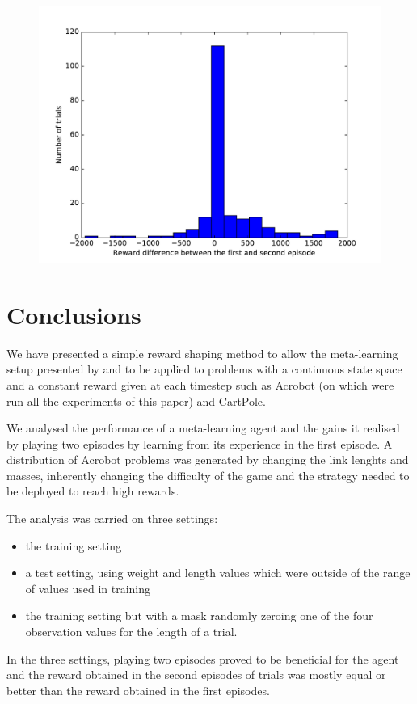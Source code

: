 \documentclass[letterpaper]{article}
\begin{document}
\begin{figure}[h]
	\centering
	\includegraphics[width=\linewidth]{fig/reward_diff_mask.pdf}
	\caption{}
	\label{fig:reward_diff_mask}
\end{figure}


\section{Conclusions}
We have presented a simple reward shaping method to allow the meta-learning
setup presented by \cite{learningtorl} and \cite{fastrlviaslowrl} to be applied
to problems with a continuous state space and a constant reward given at
each timestep such as Acrobot (on which were run all the experiments of this
paper) and CartPole.

We analysed the performance of a meta-learning agent and the gains it realised
by playing two episodes by learning from its experience in the first episode.
A distribution of Acrobot problems was generated by changing the link lenghts
and masses, inherently changing the difficulty of the game and the strategy
needed to be deployed to reach high rewards.

The analysis was carried on three settings:
\begin{itemize}
	\item the training setting
	\item a test setting, using weight and length values which were
		outside of the range of values used in training
	\item the training setting but with a mask randomly zeroing one of the
		four observation values for the length of a trial.
\end{itemize}
In the three settings, playing two episodes proved to be beneficial for the 
agent and the reward obtained in the second episodes of trials was mostly
equal or better than the reward obtained in the first episodes.
\end{document}
